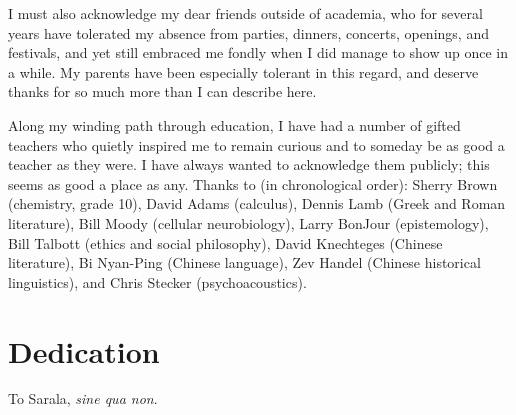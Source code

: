 \begin{spacing}{2}
I must also acknowledge my dear friends outside of academia, who for several years have tolerated my absence from parties, dinners, concerts, openings, and festivals, and yet still embraced me fondly when I did manage to show up once in a while.  My parents have been especially tolerant in this regard, and deserve thanks for so much more than I can describe here.

Along my winding path through education, I have had a number of gifted teachers who quietly inspired me to remain curious and to someday be as good a teacher as they were.  I have always wanted to acknowledge them publicly; this seems as good a place as any.  Thanks to (in chronological order): Sherry Brown (chemistry, grade 10), David Adams (calculus), Dennis Lamb (Greek and Roman literature), Bill Moody (cellular neurobiology), Larry BonJour (epistemology), Bill Talbott (ethics and social philosophy), David Knechteges (Chinese literature), Bi Nyan-Ping (Chinese language), Zev Handel (Chinese historical linguistics), and Chris Stecker (psychoacoustics).
\newpage

\chapter*{Dedication}
To Sarala, \textit{sine qua non}.
\end{spacing}
